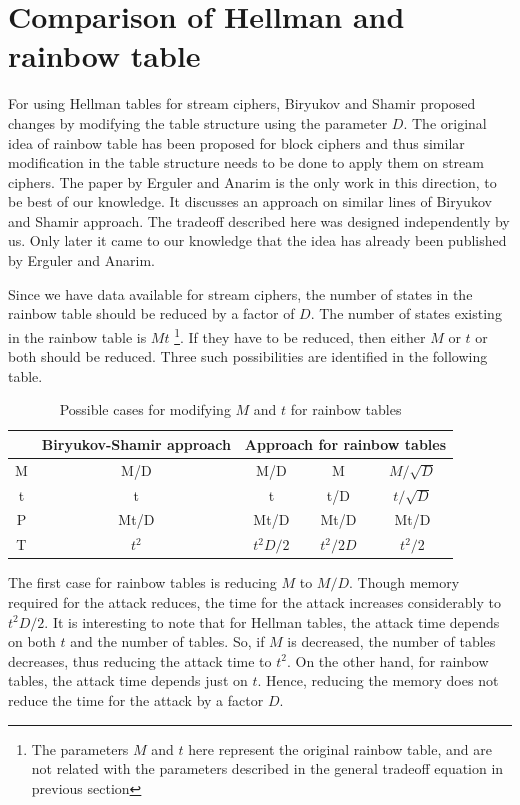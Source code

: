 \section{Comparison of Hellman and rainbow table}
\label{sec:compare-hellman-rainbow}

For using Hellman tables for stream ciphers, Biryukov and Shamir proposed changes by modifying the table structure using the parameter $D$. The original idea of rainbow table has been proposed for block ciphers and thus similar modification in the table structure needs to be done to apply them on stream ciphers. The paper \cite{erguler2005nct} by Erguler and Anarim is the only work in this direction, to be best of our knowledge. It discusses an approach on similar lines of Biryukov and Shamir approach. The tradeoff described here was designed independently by us. Only later it came to our knowledge that the idea has already been published by Erguler and Anarim.

Since we have data available for stream ciphers, the number of states in the rainbow table should be reduced by a factor of $D$. The number of states existing in the rainbow table is $Mt$ \footnote{The parameters $M$ and $t$ here represent the original rainbow table, and are not related with the parameters described in the general tradeoff equation in previous section}. If they have to be reduced, then either $M$ or $t$ or both should be reduced. Three such possibilities are identified in the following table. 

\begin{table}[ht!]
\begin{center}
\begin{tabular}{|c||c||c c c|}
\hline
			& Biryukov-Shamir approach 	& \multicolumn{3}{c|}{Approach for rainbow tables}					\\ \hline \hline
M			&	M/D		&	M/D				&	M						& $M/\sqrt{D}$	\\
t			&	t			&	t					&	t/D					& $t/\sqrt{D}$	\\ \hline \hline
P			&	Mt/D	&	Mt/D			&	Mt/D				& Mt/D					\\ 
T			&	$t^2$	&	$t^2D/2$	&	$t^2/2D$		& $t^2/2$				\\ \hline
\end{tabular}
\end{center} 
\caption{Possible cases for modifying $M$ and $t$ for rainbow tables}
\label{tab:parameters-rainbow-table}
\end{table}

The first case for rainbow tables is reducing $M$ to $M/D$. Though memory required for the attack reduces, the time for the attack increases considerably to $t^2D/2$. It is interesting to note that for Hellman tables, the attack time depends on both $t$ and the number of tables. So, if $M$ is decreased, the number of tables decreases, thus reducing the attack time to $t^2$. On the other hand, for rainbow tables, the attack time depends just on $t$. Hence, reducing the memory does not reduce the time for the attack by a factor $D$.

